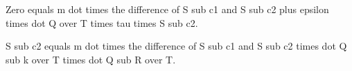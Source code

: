 Zero equals m dot times the difference of S sub c1 and S sub c2 plus epsilon times dot Q over T times tau times S sub c2.

S sub c2 equals m dot times the difference of S sub c1 and S sub c2 times dot Q sub k over T times dot Q sub R over T.